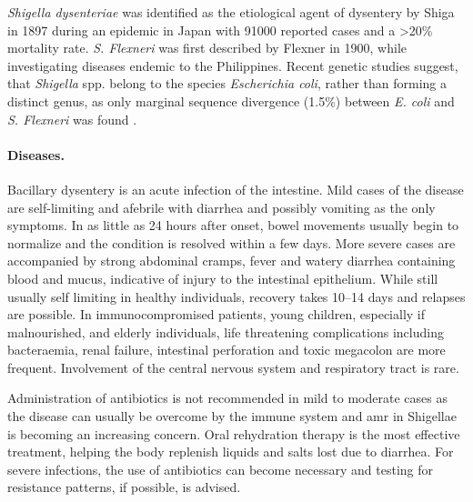 \textit{Shigella dysenteriae} was identified as the etiological agent of dysentery by Shiga in 1897 during an epidemic in Japan with 91000 reported cases and a \textgreater 20\% mortality rate. \textit{S. Flexneri} was first described by Flexner in 1900, while investigating diseases endemic to the Philippines. Recent genetic studies suggest, that \textit{Shigella} spp. belong to the species \textit{Escherichia coli}, rather than forming a distinct genus, as only marginal sequence divergence (1.5\%) between \textit{E. coli} and \textit{S. Flexneri} was found \citep{Schroeder2008}.

\paragraph{Diseases.}
Bacillary dysentery is an acute infection of the intestine. Mild cases of the disease are self-limiting and afebrile with diarrhea and possibly vomiting as the only symptoms. In as little as 24 hours after onset, bowel movements usually begin to normalize and the condition is resolved within a few days. More severe cases are accompanied by strong abdominal cramps, fever and watery diarrhea containing blood and mucus, indicative of injury to the intestinal epithelium. While still usually self limiting in healthy individuals, recovery takes 10--14 days and relapses are possible. In immunocompromised patients, young children, especially if malnourished, and elderly individuals, life threatening complications including bacteraemia, renal failure, intestinal perforation and toxic megacolon are more frequent. Involvement of the central nervous system and respiratory tract is rare.

Administration of antibiotics is not recommended in mild to moderate cases as the disease can usually be overcome by the immune system and \gls{amr} in Shigellae is becoming an increasing concern. Oral rehydration therapy is the most effective treatment, helping the body replenish liquids and salts lost due to diarrhea. For severe infections, the use of antibiotics can become necessary and testing for resistance patterns, if possible, is advised.


